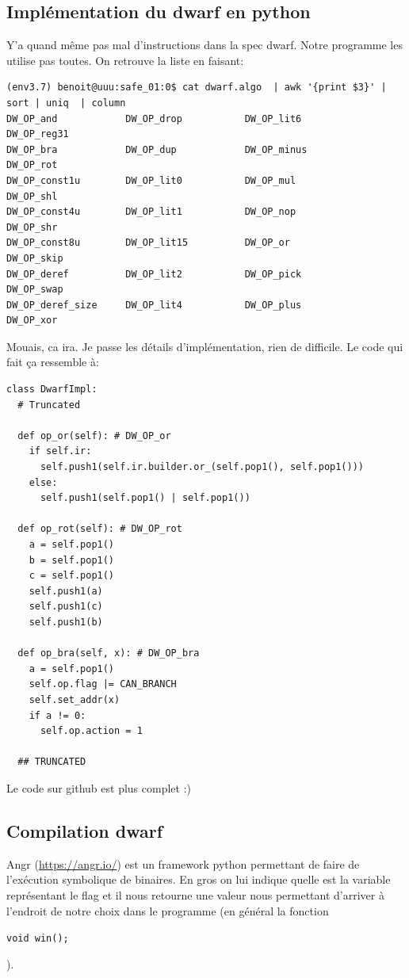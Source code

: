 \documentclass[14pt]{article}
\newcommand{\inlinebox}[2]{%
\colorbox{bg}{%
\parbox[b][0.6em]{\widthof{\texttt{#2}}}{\texttt{#2}}
}
}
\newcommand{\inlinec}[1]{ \inlinebox{c}{#1} }
\theoremstyle{definition}
\begin{document}
\subsection{Implémentation du dwarf en python}

Y'a quand même pas mal d'instructions dans la spec dwarf. Notre programme les utilise pas toutes.
On retrouve la liste en faisant:

\begin{verbatim}
(env3.7) benoit@uuu:safe_01:0$ cat dwarf.algo  | awk '{print $3}' | sort | uniq  | column
DW_OP_and            DW_OP_drop           DW_OP_lit6           DW_OP_reg31
DW_OP_bra            DW_OP_dup            DW_OP_minus          DW_OP_rot
DW_OP_const1u        DW_OP_lit0           DW_OP_mul            DW_OP_shl
DW_OP_const4u        DW_OP_lit1           DW_OP_nop            DW_OP_shr
DW_OP_const8u        DW_OP_lit15          DW_OP_or             DW_OP_skip
DW_OP_deref          DW_OP_lit2           DW_OP_pick           DW_OP_swap
DW_OP_deref_size     DW_OP_lit4           DW_OP_plus           DW_OP_xor
\end{verbatim}

Mouais, ca ira. Je passe les détails d'implémentation, rien de difficile. Le code qui fait ça ressemble à:
\begin{verbatim}
class DwarfImpl:
  # Truncated

  def op_or(self): # DW_OP_or
    if self.ir:
      self.push1(self.ir.builder.or_(self.pop1(), self.pop1()))
    else:
      self.push1(self.pop1() | self.pop1())

  def op_rot(self): # DW_OP_rot
    a = self.pop1()
    b = self.pop1()
    c = self.pop1()
    self.push1(a)
    self.push1(c)
    self.push1(b)

  def op_bra(self, x): # DW_OP_bra
    a = self.pop1()
    self.op.flag |= CAN_BRANCH
    self.set_addr(x)
    if a != 0:
      self.op.action = 1

  ## TRUNCATED 
\end{verbatim}
Le code sur github est plus complet :)


\subsection{Compilation dwarf}

Angr (\url{https://angr.io/}) est un framework python permettant de faire de l'exécution symbolique de binaires. 
En gros on lui indique quelle est la variable représentant le flag et il nous retourne une valeur nous permettant d'arriver à l'endroit de notre choix dans le programme (en général la fonction \inlinec{void win();}).\\ 
\end{document}
